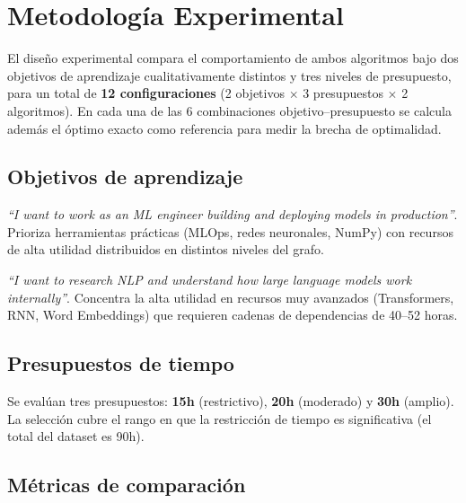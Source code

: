 \documentclass[11pt, a4paper]{article}
\begin{document}
\section{Metodología Experimental}

El diseño experimental compara el comportamiento de ambos algoritmos bajo dos objetivos de aprendizaje cualitativamente distintos y tres niveles de presupuesto, para un total de \textbf{12 configuraciones} (2 objetivos $\times$ 3 presupuestos $\times$ 2 algoritmos). En cada una de las 6 combinaciones objetivo–presupuesto se calcula además el óptimo exacto como referencia para medir la brecha de optimalidad.

\subsection{Objetivos de aprendizaje}

\begin{description}[leftmargin=1.5em, style=nextline]
  \item[Objetivo 1 (ML Engineer)] \textit{``I want to work as an ML engineer building and deploying models in production''}. Prioriza herramientas prácticas (MLOps, redes neuronales, NumPy) con recursos de alta utilidad distribuidos en distintos niveles del grafo.
  \item[Objetivo 2 (NLP Researcher)] \textit{``I want to research NLP and understand how large language models work internally''}. Concentra la alta utilidad en recursos muy avanzados (Transformers, RNN, Word Embeddings) que requieren cadenas de dependencias de 40–52 horas.
\end{description}

\subsection{Presupuestos de tiempo}

Se evalúan tres presupuestos: \textbf{15h} (restrictivo), \textbf{20h} (moderado) y \textbf{30h} (amplio). La selección cubre el rango en que la restricción de tiempo es significativa (el total del dataset es 90h).

\subsection{Métricas de comparación}
\end{document}
